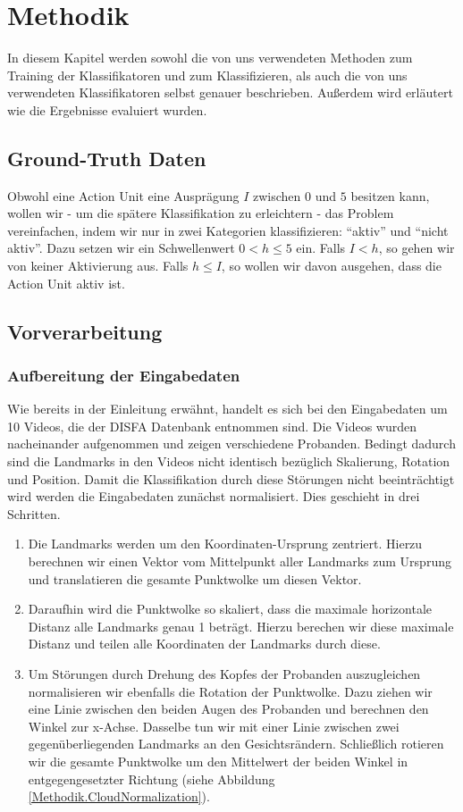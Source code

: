 \chapter{Methodik}\label{ch:methodik}
In diesem Kapitel werden sowohl die von uns verwendeten Methoden zum Training der Klassifikatoren und zum Klassifizieren,
als auch die von uns verwendeten Klassifikatoren selbst genauer beschrieben. Außerdem wird erläutert wie die Ergebnisse
evaluiert wurden.

\section{Ground-Truth Daten}
Obwohl eine Action Unit eine Ausprägung $I$ zwischen $0$ und $5$ besitzen kann, wollen wir - um die spätere Klassifikation zu erleichtern - das Problem vereinfachen, indem wir nur in zwei Kategorien klassifizieren: "`aktiv"' und "`nicht aktiv"'. Dazu setzen wir ein Schwellenwert $0<h\leq5$ ein. Falls $I<h$, so gehen wir von keiner Aktivierung aus. Falls $h\leq I$, so wollen wir davon ausgehen, dass die Action Unit aktiv ist.
\section{Vorverarbeitung}
\subsection{Aufbereitung der Eingabedaten}\label{Methodik.Aufbereitung}
Wie bereits in der Einleitung erwähnt, handelt es sich bei den Eingabedaten um 10 Videos, die der DISFA Datenbank entnommen sind.
Die Videos wurden nacheinander aufgenommen und zeigen verschiedene Probanden. Bedingt dadurch sind die Landmarks
in den Videos nicht identisch bezüglich Skalierung, Rotation und Position.\newline
Damit die Klassifikation durch diese Störungen nicht beeinträchtigt wird werden die Eingabedaten zunächst normalisiert. Dies geschieht
in drei Schritten.
\begin{enumerate}
  \item Die Landmarks werden um den Koordinaten-Ursprung zentriert. Hierzu berechnen wir einen Vektor vom Mittelpunkt aller Landmarks zum Ursprung und translatieren
        die gesamte Punktwolke um diesen Vektor.
  \item Daraufhin wird die Punktwolke so skaliert, dass die maximale horizontale Distanz alle Landmarks genau 1 beträgt. Hierzu berechen wir diese maximale Distanz und
        teilen alle Koordinaten der Landmarks durch diese.
  \item Um Störungen durch Drehung des Kopfes der Probanden auszugleichen
    normalisieren wir ebenfalls die Rotation der Punktwolke. Dazu ziehen wir
    eine Linie
    zwischen den beiden Augen des Probanden und berechnen den Winkel zur
    x-Achse. Dasselbe tun wir mit einer Linie zwischen zwei gegenüberliegenden
    Landmarks an den Gesichtsrändern. Schließlich rotieren wir die gesamte
    Punktwolke um den Mittelwert der beiden Winkel in entgegengesetzter Richtung  (siehe Abbildung \ref{Methodik.CloudNormalization}).
\end{enumerate}


